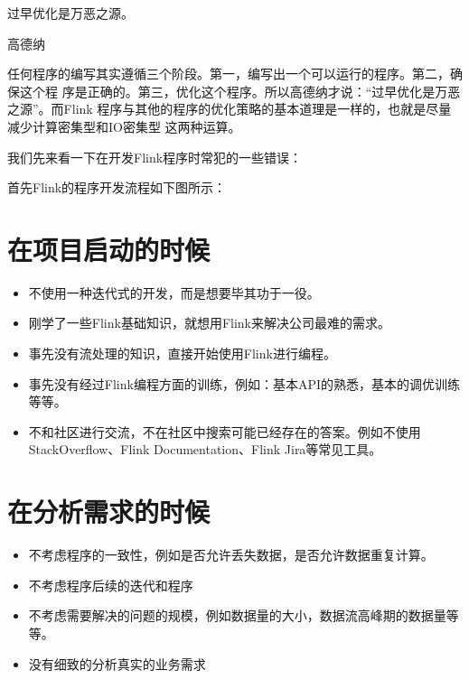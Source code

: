 \documentclass[cn,11pt,chinese]{elegantbook}
\begin{document}
\epigraph{过早优化是万恶之源。}{高德纳}

任何程序的编写其实遵循三个阶段。第一，编写出一个可以运行的程序。第二，确保这个程
序是正确的。第三，优化这个程序。所以高德纳才说：“过早优化是万恶之源”。而Flink
程序与其他的程序的优化策略的基本道理是一样的，也就是尽量减少计算密集型和IO密集型
这两种运算。

我们先来看一下在开发Flink程序时常犯的一些错误：

首先Flink的程序开发流程如下图所示：



\section{在项目启动的时候}

\begin{itemize}
\item 不使用一种迭代式的开发，而是想要毕其功于一役。
\item 刚学了一些Flink基础知识，就想用Flink来解决公司最难的需求。
\item 事先没有流处理的知识，直接开始使用Flink进行编程。
\item 事先没有经过Flink编程方面的训练，例如：基本API的熟悉，基本的调优训练等等。
\item 不和社区进行交流，不在社区中搜索可能已经存在的答案。例如不使用
  StackOverflow、Flink Documentation、Flink Jira等常见工具。
\end{itemize}

\section{在分析需求的时候}

\begin{itemize}
\item 不考虑程序的一致性，例如是否允许丢失数据，是否允许数据重复计算。
\item 不考虑程序后续的迭代和程序
\item 不考虑需要解决的问题的规模，例如数据量的大小，数据流高峰期的数据量等等。
\item 没有细致的分析真实的业务需求
\end{itemize}
\end{document}
